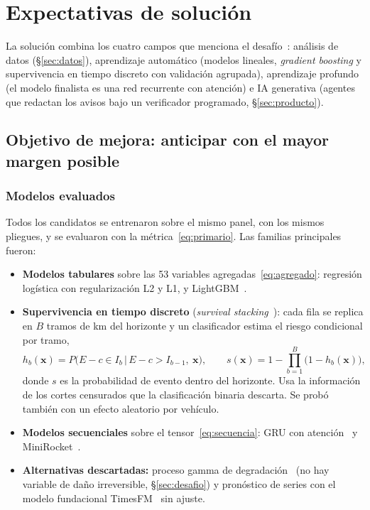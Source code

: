 \section{Expectativas de solución}
\label{sec:solucion}

La solución combina los cuatro campos que menciona el desafío~\cite{ford}: análisis de datos (\S\ref{sec:datos}),
aprendizaje automático (modelos lineales, \emph{gradient boosting} y supervivencia en tiempo discreto con validación
agrupada), aprendizaje profundo (el modelo finalista es una red recurrente con atención) e IA generativa (agentes que redactan
los avisos bajo un verificador programado, \S\ref{sec:producto}).

\subsection{Objetivo de mejora: anticipar con el mayor margen posible}
\label{sec:objetivo}

\subsubsection{Modelos evaluados}
\label{sec:modelos}

Todos los candidatos se entrenaron sobre el mismo panel, con los mismos pliegues, y se evaluaron con la
métrica~\eqref{eq:primario}. Las familias principales fueron:

\begin{itemize}
  \item \textbf{Modelos tabulares} sobre las 53 variables agregadas~\eqref{eq:agregado}: regresión logística con
    regularización L2 y L1, y LightGBM~\cite{ke2017}.
  \item \textbf{Supervivencia en tiempo discreto} (\emph{survival stacking}~\cite{craig2021,tutz2016}): cada fila se
    replica en $B$ tramos de km del horizonte y un clasificador estima el riesgo condicional por tramo,
    \begin{equation}
      h_b(\mathbf{x}) = P\big(E - c \in I_b \,\big|\, E - c > I_{b-1},\ \mathbf{x}\big), \qquad
      s(\mathbf{x}) = 1 - \prod_{b=1}^{B} \big(1 - h_b(\mathbf{x})\big),
      \label{eq:ss}
    \end{equation}
    donde $s$ es la probabilidad de evento dentro del horizonte. Usa la información de los cortes censurados que la
    clasificación binaria descarta. Se probó también con un efecto aleatorio por vehículo.
  \item \textbf{Modelos secuenciales} sobre el tensor~\eqref{eq:secuencia}: GRU con atención~\cite{cho2014,bahdanau2015}
    y MiniRocket~\cite{dempster2021}.
  \item \textbf{Alternativas descartadas:} proceso gamma de degradación~\cite{vannoortwijk2009} (no hay variable de daño
    irreversible, \S\ref{sec:desafio}) y pronóstico de series con el modelo fundacional TimesFM~\cite{das2024} sin ajuste.
\end{itemize}

